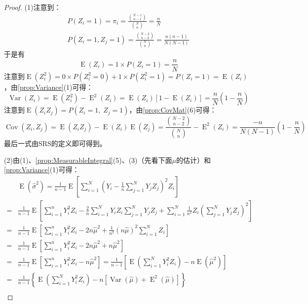 \begin{proof}
	(1)注意到：
	\begin{gather*}
		P(Z_i=1)=\pi_i=\frac{\binom{N-1}{n-1}}{\binom{N}{n}}=\frac{n}{N} \\
		P(Z_i=1,Z_j=1)=\frac{\binom{N-2}{n-2}}{\binom{N}{n}}=\frac{n(n-1)}{N(N-1)}
	\end{gather*}
	于是有
	\begin{equation*}
		\operatorname{E}(Z_i)=1\times P(Z_i=1)=\frac{n}{N}
	\end{equation*}
	注意到$\operatorname{E}(Z_i^2)=0\times P(Z_i^2=0)+1\times P(Z_i^2=1)=P(Z_i=1)=\operatorname{E}(Z_i)$，由\cref{prop:Variance}(1)可得：
	\begin{equation*}
		\operatorname{Var}(Z_i)=\operatorname{E}(Z_i^2)-\operatorname{E}^2(Z_i)
		=\operatorname{E}(Z_i)[1-\operatorname{E}(Z_i)]
		=\frac{n}{N}\left(1-\frac{n}{N}\right)
	\end{equation*}
	注意到$\operatorname{E}(Z_iZ_j)=P(Z_i=1,\;Z_j=1)$，由\cref{prop:CovMat}(6)可得：
	\begin{equation*}
		\operatorname{Cov}(Z_i,Z_j)=\operatorname{E}(Z_iZ_j)-\operatorname{E}(Z_i)\operatorname{E}(Z_j)
		=\frac{\binom{N-2}{n-2}}{\binom{N}{n}}-\operatorname{E}^2(Z_i)
		=\frac{-n}{N(N-1)}\left(1-\frac{n}{N}\right)
	\end{equation*}
	最后一式由SRS的定义即可得到。\par
	(2)由(1)、\cref{prop:MeasurableIntegral}(5)、(3)（先看下面$\mu$的估计）和\cref{prop:Variance}(1)可得：
	\begin{align*}
		&\operatorname{E}(\hat{\sigma}^2)=\frac{1}{n-1}\operatorname{E}\left[\sum_{i=1}^N\left(Y_i-\frac{1}{n}\sum_{j=1}^{N}Y_jZ_j\right)^2Z_i\right] \\
		=&\frac{1}{n-1}\operatorname{E}\left[\sum_{i=1}^{n}Y_i^2Z_i-\frac{2}{n}\sum_{i=1}^{N}Y_iZ_i\sum_{j=1}^{N}Y_jZ_j+\sum_{i=1}^{N}\frac{1}{n^2}Z_i\left(\sum_{j=1}^{N}Y_jZ_j\right)^2\right] \\
		=&\frac{1}{n-1}\operatorname{E}\left[\sum_{i=1}^{n}Y_i^2Z_i-2n\hat{\mu}^2+\frac{1}{n^2}(n\hat{\mu})^2\sum_{i=1}^NZ_i\right] \\
		=&\frac{1}{n-1}\operatorname{E}\left[\sum_{i=1}^{n}Y_i^2Z_i-2n\hat{\mu}^2+n\hat{\mu}^2\right] \\
		=&\frac{1}{n-1}\operatorname{E}\left[\sum_{i=1}^{n}Y_i^2Z_i-n\hat{\mu}^2\right]=\frac{1}{n-1}\left[\operatorname{E}\left(\sum_{i=1}^{N}Y_i^2Z_i\right)-n\operatorname{E}(\hat{\mu}^2)\right] \\
		=&\frac{1}{n-1}\left\{\operatorname{E}\left(\sum_{i=1}^{N}Y_i^2Z_i\right)-n[\operatorname{Var}(\hat{\mu})+\operatorname{E}^2(\hat{\mu})]\right\} \\

\end{align*}
\end{proof}
